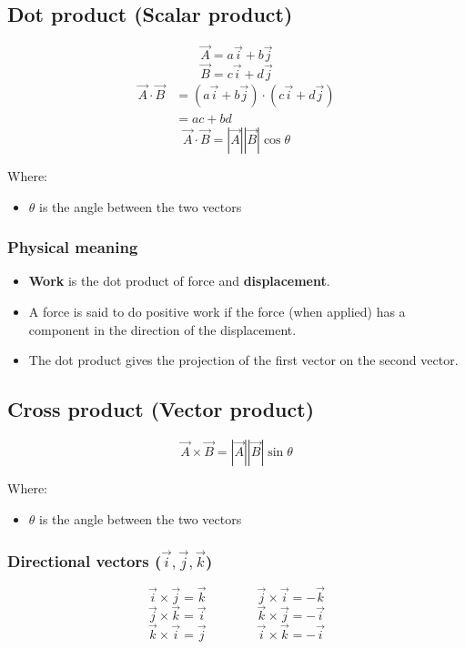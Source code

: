 \documentclass[11pt]{article}
\begin{document}
 \newpage
\subsection{Dot product (Scalar product)}
\label{sec:orga7a73ea}
\[\vec{A} = a \vec{i} + b \vec{j}\]
\[\vec{B} = c \vec{i} + d \vec{j}\]
\begin{align*}
\vec{A} \cdot \vec{B} &= \left( a \vec{i} + b \vec{j} \right) \cdot \left(c \vec{i} + d \vec{j} \right) \\
&= ac + bd
\end{align*}
\[\vec{A} \cdot \vec{B} = |\vec{A}| |\vec{B}| \cos \theta\]

Where:
\begin{itemize}
\item \(\theta\) is the angle between the two vectors
\end{itemize}
\subsubsection{Physical meaning}
\label{sec:org035d67e}
\begin{itemize}
\item \textbf{Work} is the dot product of force and \textbf{displacement}.
\item A force is said to do positive work if the force (when applied) has a component in the direction of the displacement.
\item The dot product gives the projection of the first vector on the second vector.
\end{itemize}
\subsection{Cross product (Vector product)}
\label{sec:org31e5642}
\[\vec{A} \times \vec{B} = |\vec{A}| |\vec{B}| \sin \theta\]

Where:
\begin{itemize}
\item \(\theta\) is the angle between the two vectors
\end{itemize}
\subsubsection{Directional vectors (\(\vec{i}, \vec{j}, \vec{k}\))}
\label{sec:orgdf02dd6}
\[\vec{i} \times \vec{j} = \vec{k} \qquad \qquad \vec{j} \times \vec{i} = -\vec{k}\]
\[\vec{j} \times \vec{k} = \vec{i} \qquad \qquad \vec{k} \times \vec{j} = -\vec{i}\]
\[\vec{k} \times \vec{i} = \vec{j} \qquad \qquad \vec{i} \times \vec{k} = -\vec{i}\]
\end{document}
